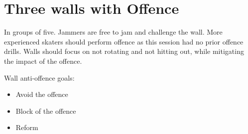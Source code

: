 \section*{Three walls with Offence}
\label{drill:three_wall/offence}

In groups of five. 
Jammers are free to jam and challenge the wall.
More experienced skaters should perform offence as this session had no prior offence drills.  
Walls should focus on not rotating and not hitting out, while mitigating the impact of the offence.

Wall anti-offence goals:
\begin{itemize}
\item Avoid the offence 
\item Block of the offence 
\item Reform 
\end{itemize}
